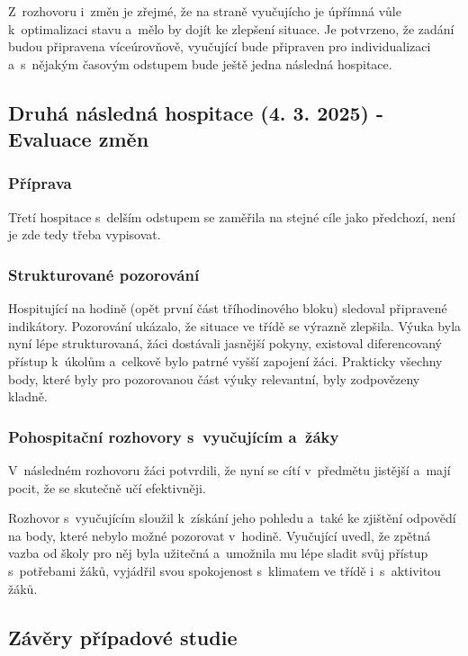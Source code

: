 Z~rozhovoru i~změn je zřejmé, že na straně vyučujícho je úpřímná vůle k~optimalizaci stavu a~mělo by dojít ke zlepšení situace. Je potvrzeno, že zadání budou připravena víceúrovňově, vyučující bude připraven pro individualizaci a~s~nějakým časovým odstupem bude ještě jedna následná hospitace.

\subsection{Druhá následná hospitace (4. 3. 2025) - Evaluace změn}

\subsubsection*{Příprava}

Třetí hospitace s~delším odstupem se zaměřila na stejné cíle jako předchozí, není je zde tedy třeba vypisovat.

\subsubsection*{Strukturované pozorování}

Hospitující na hodině (opět první část tříhodinového bloku) sledoval připravené indikátory. Pozorování ukázalo, že situace ve třídě se výrazně zlepšila. Výuka byla nyní lépe strukturovaná, žáci dostávali jasnější pokyny, existoval diferencovaný přístup k~úkolům a~celkově bylo patrné vyšší zapojení žáci. Prakticky všechny body, které byly pro pozorovanou část výuky relevantní, byly zodpovězeny kladně.

\subsubsection*{Pohospitační rozhovory s~vyučujícím a~žáky}

V~následném rozhovoru žáci potvrdili, že nyní se cítí v~předmětu jistější a~mají pocit, že se skutečně učí efektivněji. 

Rozhovor s~vyučujícím sloužil k~získání jeho pohledu a~také ke zjištění odpovědí na body, které nebylo možné pozorovat v~hodině. Vyučující uvedl, že zpětná vazba od školy pro něj byla užitečná a~umožnila mu lépe sladit svůj přístup s~potřebami žáků, vyjádřil svou spokojenost s~klimatem ve třídě i~s~aktivitou žáků.

\subsection{Závěry případové studie}


